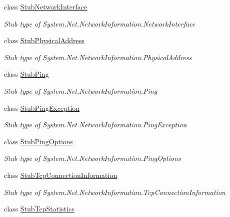 \begin{DoxyCompactItemize}
class \hyperlink{class_system_1_1_net_1_1_network_information_1_1_fakes_1_1_stub_network_interface}{Stub\-Network\-Interface}
\begin{DoxyCompactList}\small\item\em Stub type of System.\-Net.\-Network\-Information.\-Network\-Interface\end{DoxyCompactList}\item 
class \hyperlink{class_system_1_1_net_1_1_network_information_1_1_fakes_1_1_stub_physical_address}{Stub\-Physical\-Address}
\begin{DoxyCompactList}\small\item\em Stub type of System.\-Net.\-Network\-Information.\-Physical\-Address\end{DoxyCompactList}\item 
class \hyperlink{class_system_1_1_net_1_1_network_information_1_1_fakes_1_1_stub_ping}{Stub\-Ping}
\begin{DoxyCompactList}\small\item\em Stub type of System.\-Net.\-Network\-Information.\-Ping\end{DoxyCompactList}\item 
class \hyperlink{class_system_1_1_net_1_1_network_information_1_1_fakes_1_1_stub_ping_exception}{Stub\-Ping\-Exception}
\begin{DoxyCompactList}\small\item\em Stub type of System.\-Net.\-Network\-Information.\-Ping\-Exception\end{DoxyCompactList}\item 
class \hyperlink{class_system_1_1_net_1_1_network_information_1_1_fakes_1_1_stub_ping_options}{Stub\-Ping\-Options}
\begin{DoxyCompactList}\small\item\em Stub type of System.\-Net.\-Network\-Information.\-Ping\-Options\end{DoxyCompactList}\item 
class \hyperlink{class_system_1_1_net_1_1_network_information_1_1_fakes_1_1_stub_tcp_connection_information}{Stub\-Tcp\-Connection\-Information}
\begin{DoxyCompactList}\small\item\em Stub type of System.\-Net.\-Network\-Information.\-Tcp\-Connection\-Information\end{DoxyCompactList}\item 
class \hyperlink{class_system_1_1_net_1_1_network_information_1_1_fakes_1_1_stub_tcp_statistics}{Stub\-Tcp\-Statistics}

\end{DoxyCompactItemize}
